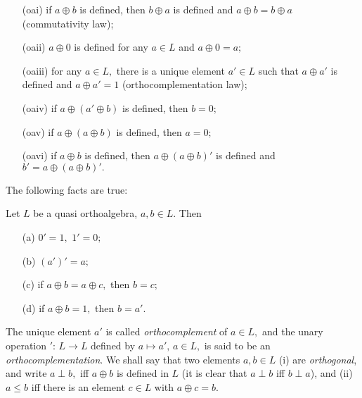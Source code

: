 \begin{enumerate}
\item[{\rm (oai)}]  if $a\oplus b$ is defined, then $b \oplus a$ is
defined and $a \oplus b = b \oplus a$ (commutativity law);\vspace{-2mm}

\item[{\rm (oaii)}] $a \oplus 0$ is defined for any $a \in L$
and $a \oplus 0 = a;$\vspace{-2mm}

\item[{\rm (oaiii)}] for any $a \in L,$ there is a unique element
$a' \in L$ such that $a \oplus a'$ is defined and $a \oplus a' = 1$
(orthocomplementation law);\vspace{-2mm}


\item[{\rm (oaiv)}] if $a \oplus (a' \oplus b) $ is defined, then $ b = 0;$
\vspace{-2mm}

\item[{\rm (oav)}] if $a \oplus (a \oplus b) $ is defined, then
$a = 0;$\vspace{-2mm}

\item[{\rm (oavi)}] if $a \oplus b$ is defined, then $a \oplus (a \oplus b)'$
is defined and $b'= a \oplus (a \oplus b)'.$

\end{enumerate}

The following facts are true:



\begin{proposition} Let $L$ be a quasi orthoalgebra, $a, b \in L.$
Then
\begin{enumerate}
\item[{\rm (a)}] $0'=1,$ $1'=0;$\vspace{-2mm}
\item[{\rm (b)}] $(a')' = a;$\vspace{-2mm}
\item[{\rm (c)}] if $a \oplus b = a \oplus c,$ then $b = c;$\vspace{-2mm}
\item[{\rm (d)}] if $a \oplus b = 1,$ then $b = a'.$
\end{enumerate}
\end{proposition}

The unique element $a'$ is called {\it orthocomplement} of $a \in L,$
and the unary operation $':\, L \to L$ defined by $a \mapsto a',\, a \in L,$
is said to be an  {\it orthocomplementation}.
We shall say that two elements $a,b \in L$  (i) are {\it orthogonal},
and write $a \perp b,$ iff $a \oplus b $ is defined in $L$
(it is clear that $a \perp b$ iff $b \perp a$),
and (ii)
 $a \le b$ iff there is an element $c \in L$ with $a \oplus c = b.$

